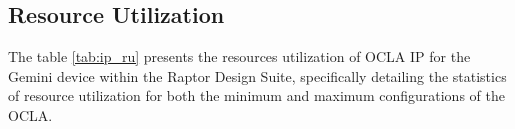 \subsection*{\fontsize{14}{16}\selectfont Resource Utilization}
The table \ref{tab:ip_ru} presents the resources utilization of OCLA IP for the Gemini device within the Raptor Design Suite, specifically detailing the statistics of resource utilization for both the minimum and maximum configurations of the OCLA.
\\ \\
